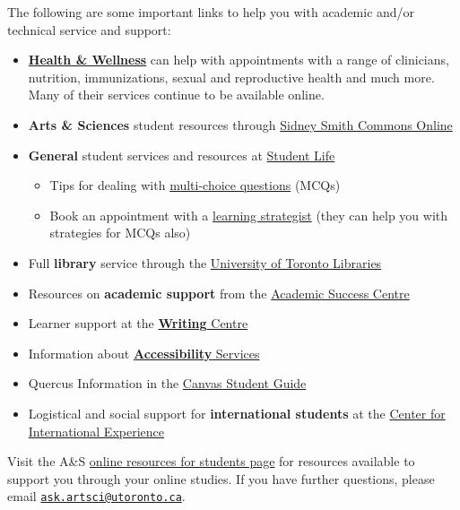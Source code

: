 \documentclass[
]{book}
\begin{document}
The following are some important links to help you with academic and/or technical service and support:

\begin{itemize}
\item
  \href{https://studentlife.utoronto.ca/department/health-wellness/}{\textbf{Health \& Wellness}} can help with appointments with a range of clinicians, nutrition, immunizations, sexual and reproductive health and much more. Many of their services continue to be available online.
\item
  \textbf{Arts \& Sciences} student resources through \href{https://sidneysmithcommons.artsci.utoronto.ca/}{Sidney Smith Commons Online}
\item
  \textbf{General} student services and resources at \href{https://www.studentlife.utoronto.ca/}{Student Life}

  \begin{itemize}
  \item
    Tips for dealing with \href{https://studentlife.utoronto.ca/task/multiple-choice-tests-and-exams/}{multi-choice questions} (MCQs)
  \item
    Book an appointment with a \href{https://studentlife.utoronto.ca/service/learning-strategist-connections/}{learning strategist} (they can help you with strategies for MCQs also)
  \end{itemize}
\item
  Full \textbf{library} service through the \href{http://onesearch.library.utoronto.ca/}{University of Toronto Libraries}
\item
  Resources on \textbf{academic support} from the \href{http://www.asc.utoronto.ca/}{Academic Success Centre}
\item
  Learner support at the \href{http://www.writing.utoronto.ca/}{\textbf{Writing} Centre}
\item
  Information about \href{http://accessibility.utoronto.ca/}{\textbf{Accessibility} Services}
\item
  Quercus Information in the \href{https://community.canvaslms.com/docs/DOC-10701}{Canvas Student Guide}
\item
  Logistical and social support for \textbf{international students} at the \href{https://studentlife.utoronto.ca/cie}{Center for International Experience}
\end{itemize}

Visit the A\&S \href{https://www.artsci.utoronto.ca/current/academic-advising-and-support/online-resources-students}{online resources for students page} for resources available to support you through your online studies. If you have further questions, please email \href{mailto:ask.artsci@utoronto.ca}{\nolinkurl{ask.artsci@utoronto.ca}}.
\end{document}
